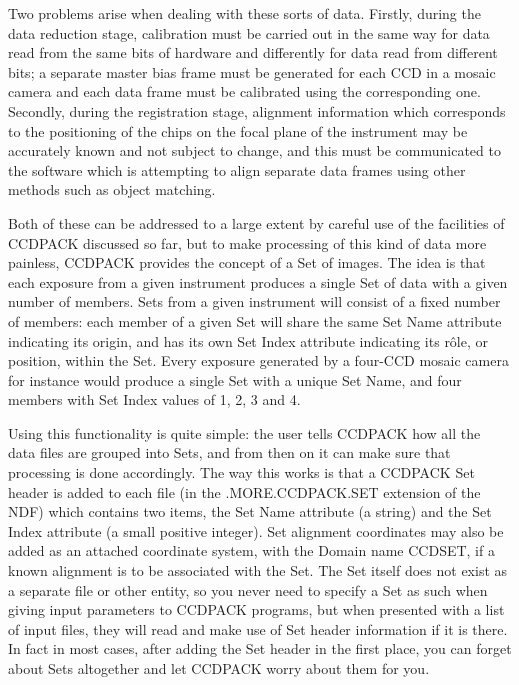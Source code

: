 \documentclass[twoside,11pt]{article}
\renewcommand{\_}{\texttt{\symbol{95}}}
\begin{document}
Two problems arise when dealing with these sorts of data.
Firstly, during the data reduction stage, calibration must be 
carried out in the same way for data read from the same bits of
hardware and differently for data read from different bits;
a separate master bias frame must be generated for each CCD in
a mosaic camera and each data frame must be calibrated using
the corresponding one.
Secondly, during the registration stage, alignment information
which corresponds to the positioning of the chips on the 
focal plane of the instrument may be accurately known and not
subject to change, and this must be communicated to the software
which is attempting to align separate data frames using
other methods such as object matching.

Both of these can be addressed to a large extent by careful use of the
facilities of CCDPACK discussed so far, 
but to make processing of this kind of
data more painless, CCDPACK provides the concept of a Set of images.  
The idea is that each exposure from a given instrument produces
a single Set of data with a given number of members.  
Sets from a given instrument will consist of a fixed number of members:
each member of a given Set will share the same Set Name attribute
indicating its origin, 
and has its own Set Index attribute 
indicating its r\^{o}le, or position, within the Set.
Every exposure generated by a four-CCD mosaic camera for instance would
produce a single Set with a unique Set Name, 
and four members with Set Index values of 1, 2, 3 and 4.

Using this functionality is quite simple: the user tells CCDPACK
how all the data files are grouped into Sets, and from then on
it can make sure that processing is done accordingly.
The way this works is that
a CCDPACK Set header is added to each file
(in the .MORE.CCDPACK.SET extension of the NDF) which contains
two items, the Set Name attribute (a string) and the Set Index
attribute (a small positive integer).  Set alignment coordinates
may also be added as an attached coordinate system,
with the Domain name CCD\_SET,
if a known alignment is to be associated with the Set.
The Set itself does not exist as a separate file or other entity,
so you never need to specify a Set as such when giving input
parameters to CCDPACK programs, but when presented with a list
of input files, they will read and make use of Set header information
if it is there.  In fact in most cases, after adding the Set header
in the first place, you can forget about Sets altogether and let
CCDPACK worry about them for you.
\end{document}
